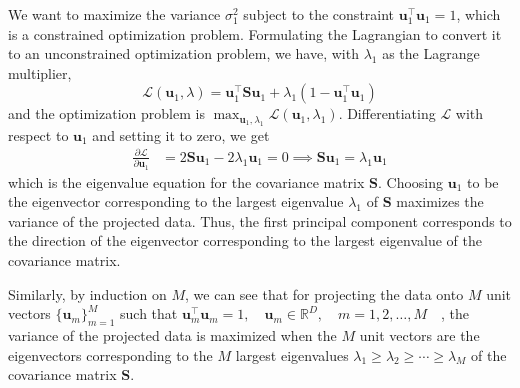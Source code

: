 We want to maximize the variance \( \sigma_1^2 \) subject to the constraint \( \mathbf{u}_1^\top \mathbf{u}_1 = 1 \), which is a constrained optimization problem.
Formulating the Lagrangian to convert it to an unconstrained optimization problem, we have, with \( \lambda_1 \) as the Lagrange multiplier,
\begin{equation*}
    \mathcal{L}(\mathbf{u}_1, \lambda)
    =
    \mathbf{u}_1^\top \mathbf{S} \mathbf{u}_1 + \lambda_1 (1 - \mathbf{u}_1^\top \mathbf{u}_1)
\end{equation*}
and the optimization problem is \( \max_{\mathbf{u}_1, \lambda_1} \mathcal{L}(\mathbf{u}_1, \lambda_1) \).
Differentiating \( \mathcal{L} \) with respect to \( \mathbf{u}_1 \) and setting it to zero, we get
\begin{align*}
    \frac{\partial \mathcal{L}}{\partial \mathbf{u}_1}
     & =
    2 \mathbf{S} \mathbf{u}_1 - 2 \lambda_1 \mathbf{u}_1
    =
    0
    \implies
    \mathbf{S} \mathbf{u}_1 = \lambda_1 \mathbf{u}_1
\end{align*}
which is the eigenvalue equation for the covariance matrix \( \mathbf{S} \).
Choosing \( \mathbf{u}_1 \) to be the eigenvector corresponding to the largest eigenvalue \( \lambda_1 \) of \( \mathbf{S} \) maximizes the variance of the projected data.
Thus, the first principal component corresponds to the direction of the eigenvector corresponding to the largest eigenvalue of the covariance matrix.

Similarly, by induction on \( M \), we can see that for projecting the data onto \( M \) unit vectors \( {\{ \mathbf{u}_m \}}_{m=1}^{M} \) such that \( \mathbf{u}_m^\top \mathbf{u}_m = 1, \quad \mathbf{u}_m \in \mathbb{R}^D, \quad m = 1, 2, \dots, M \quad \), the variance of the projected data is maximized when the \( M \) unit vectors are the eigenvectors corresponding to the \( M \) largest eigenvalues \( \lambda_1 \geq \lambda_2 \geq \cdots \geq \lambda_M \) of the covariance matrix \( \mathbf{S} \).

